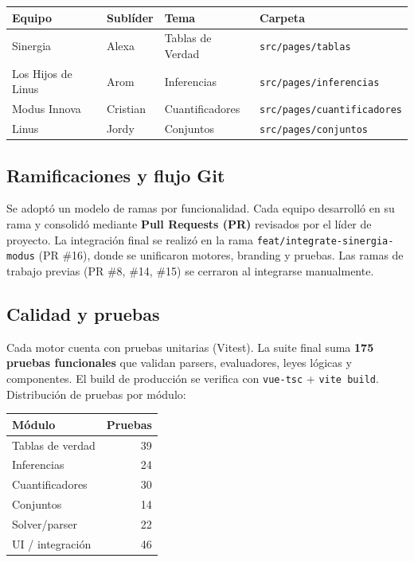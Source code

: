 \documentclass[12pt,a4paper]{article}
\begin{document}
\begin{center}
\begin{tabular}{llll}
\toprule
Equipo & Sublíder & Tema & Carpeta \\
\midrule
Sinergia & Alexa & Tablas de Verdad & \texttt{src/pages/tablas} \\
Los Hijos de Linus & Arom & Inferencias & \texttt{src/pages/inferencias} \\
Modus Innova & Cristian & Cuantificadores & \texttt{src/pages/cuantificadores} \\
Linus & Jordy & Conjuntos & \texttt{src/pages/conjuntos} \\
\bottomrule
\end{tabular}
\end{center}

\subsection{Ramificaciones y flujo Git}
Se adoptó un modelo de ramas por funcionalidad. Cada equipo desarrolló en su rama y consolidó
mediante \textbf{Pull Requests (PR)} revisados por el líder de proyecto. La integración final se
realizó en la rama \texttt{feat/integrate-sinergia-modus} (PR \#16), donde se unificaron motores,
branding y pruebas. Las ramas de trabajo previas (PR \#8, \#14, \#15) se cerraron al integrarse
manualmente.

\subsection{Calidad y pruebas}
Cada motor cuenta con pruebas unitarias (Vitest). La suite final suma \textbf{175 pruebas
funcionales} que validan parsers, evaluadores, leyes lógicas y componentes. El build de producción se
verifica con \texttt{vue-tsc} + \texttt{vite build}. Distribución de pruebas por módulo:

\begin{center}
\begin{tabular}{lr}
\toprule
Módulo & Pruebas \\
\midrule
Tablas de verdad & 39 \\
Inferencias & 24 \\
Cuantificadores & 30 \\
Conjuntos & 14 \\
Solver/parser & 22 \\
UI / integración & 46 \\
\bottomrule
\end{tabular}
\end{center}
\end{document}
